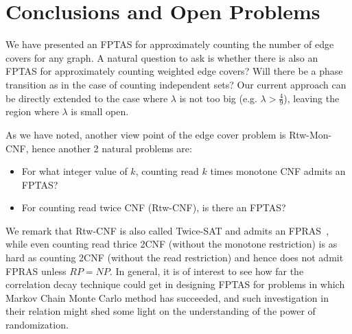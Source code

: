 \section{Conclusions and Open Problems}
We have presented an FPTAS for approximately counting the number of edge covers for any graph. A natural question to ask is whether there is also an FPTAS for approximately counting weighted edge covers? Will there be a phase transition as in the case of counting independent sets? Our current approach can be directly extended to the case where $\lambda$ is not too big (e.g. $\lambda > \frac{4}{9}$), leaving the region where $\lambda$ is small open.

As we have noted, another view point of the edge cover problem is Rtw-Mon-CNF, hence another 2 natural problems are:
\begin{itemize}
	\item For what integer value of $k$, counting read $k$ times monotone CNF admits an FPTAS?
	\item For counting read twice CNF (Rtw-CNF), is there an FPTAS?
\end{itemize}
We remark that Rtw-CNF is also called Twice-SAT and admits an FPRAS~\cite{TwiceSAT}, while even counting read thrice 2CNF (without the monotone restriction) is as hard as counting 2CNF (without the read restriction) and hence does not admit FPRAS unless $RP=NP$.
In general, it is of interest to see how far the correlation decay technique could get in designing FPTAS for problems in which Markov Chain Monte Carlo method has succeeded, and such investigation in their relation might shed some light on the understanding of the power of randomization.

